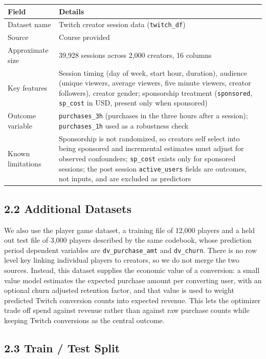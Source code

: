 \documentclass[11pt]{article}
\begin{document}
\begin{tabular}{@{}p{3.5cm}p{9.5cm}@{}}
\toprule
\textbf{Field} & \textbf{Details} \\
\midrule
Dataset name   & Twitch creator session data (\texttt{twitch\_df}) \\
Source         & Course provided \\
Approximate size & 39,928 sessions across 2,000 creators, 16 columns \\
Key features   & Session timing (day of week, start hour, duration), audience (unique viewers, average viewers, five minute viewers, creator followers), creator gender; sponsorship treatment (\texttt{sponsored}, \texttt{sp\_cost} in USD, present only when sponsored) \\
Outcome variable & \texttt{purchases\_3h} (purchases in the three hours after a session); \texttt{purchases\_1h} used as a robustness check \\
Known limitations & Sponsorship is not randomized, so creators self select into being sponsored and incremental estimates must adjust for observed confounders; \texttt{sp\_cost} exists only for sponsored sessions; the post session \texttt{active\_users} fields are outcomes, not inputs, and are excluded as predictors \\
\bottomrule
\end{tabular}

\subsection*{2.2 \; Additional Datasets}

We also use the player game dataset, a training file of 12,000 players and a held out test file of 3,000 players described by the same codebook, whose prediction period dependent variables are \texttt{dv\_purchase\_amt} and \texttt{dv\_churn}. There is no row level key linking individual players to creators, so we do not merge the two sources. Instead, this dataset supplies the economic value of a conversion: a small value model estimates the expected purchase amount per converting user, with an optional churn adjusted retention factor, and that value is used to weight predicted Twitch conversion counts into expected revenue. This lets the optimizer trade off spend against revenue rather than against raw purchase counts while keeping Twitch conversions as the central outcome.

\subsection*{2.3 \; Train / Test Split}
\end{document}
